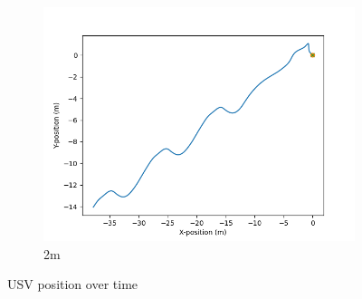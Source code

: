 \documentclass[class=article, crop=false]{standalone}
\begin{document}
\begin{figure}
\begin{subfigure}[b]{0.48\textwidth}
        \includegraphics{scenario1/rov-50m/2.0m/usv_position_uncontrolled}
        \caption{2m}
        \label{}
    \end{subfigure}

    \caption{USV position over time}
\end{figure}
\end{document}
